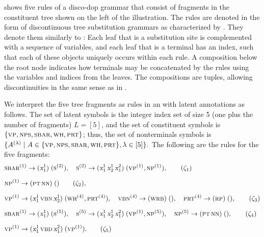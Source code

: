 \documentclass[../../document.tex]{subfiles}
\begin{document}
    \begin{example}\label{ex:dop}\NoEndMark
         shows five rules of a disco-dop grammar that consist of fragments in the constituent tree shown on the left of the illustration.
        The rules are denoted in the form of discontinuous tree substitution grammars as characterized by \citet{CraSchBod16}.
        They denote them similarly to :
            Each leaf that is a substitution site is complemented with a sequence of variables, and each leaf that is a terminal has an index, such that each of these objects uniquely occurs within each rule.
            A composition below the root node indicates how terminals may be concatenated by the rules using the variables and indices from the leaves.
            The compositions are tuples, allowing discontinuities in the same sense as in .
        
        We interpret the five tree fragments as rules in an  with latent annotations as follows.
        The set of latent symbols is the integer index set of size 5 (one plus the number of fragments) \(L = [5]\), and the set of constituent symbols is \(\{\textsc{vp}, \textsc{np} \textsc{s}, \textsc{sbar}, \textsc{wh}, \textsc{prt}\}\); thus, the set of nonterminals symbols is \(
            \{ A^{(\lambda)} \mid A \in \{\textsc{vp}, \textsc{np} \textsc{s}, \textsc{sbar}, \textsc{wh}, \textsc{prt}\} , \lambda \in [5]\}  \text{.}
        \)
        The following are the  rules for the five fragments:
        \begin{align*}
            &\textsc{sbar}^{(1)} \to (\textsl{x}^1_1)\;(\textsc{s}^{(2)}),\quad
                \textsc{s}^{(2)} \to (\textsl{x}^1_1\,\textsl{x}_2^1\,\textsl{x}_1^2)\;(\textsc{vp}^{(1)}, \textsc{np}^{(1)}), \tag{$\zeta_1$}\\[.2cm]
            &\textsc{np}^{(1)} \to (\textsc{pt}\,\textsc{nn})\;() \tag{$\zeta_2$},\\[.2cm]
            &\textsc{vp}^{(1)} \to (\textsl{x}_1^1\,\textsc{vbn}\,\textsl{x}_2^1)\;(\textsc{wh}^{(4)}, \textsc{prt}^{(4)}),\quad
                 \textsc{vbn}^{(4)} \to (\textsc{wrb})\;(),\quad
                 \textsc{prt}^{(4)} \to (\textsc{rp})\;(), \tag{$\zeta_3$}\\[.2cm]
            &\textsc{sbar}^{(1)} \to (\textsl{x}^1_1)\;(\textsc{s}^{(5)}),\quad
                \textsc{s}^{(5)} \to (\textsl{x}^1_1\,\textsl{x}_2^1\,\textsl{x}_1^2)\;(\textsc{vp}^{(1)}, \textsc{np}^{(5)}),\quad
                \textsc{np}^{(5)} \to (\textsc{pt}\,\textsc{nn})\;(), \tag{$\zeta_4$}\\[.2cm]
            &\textsc{vp}^{(1)} \to (\textsl{x}^1_1\,\textsc{vbd}\,\textsl{x}_1^2)\;(\textsc{vp}^{(1)})\text{.} \tag{$\zeta_5$}
        \end{align*}


\end{example}
\end{document}
